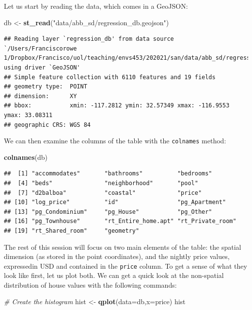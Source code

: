 \documentclass[
]{book}
\newenvironment{Shaded}{\begin{snugshade}}{\end{snugshade}}
\newcommand{\CommentTok}[1]{\textcolor[rgb]{0.56,0.35,0.01}{\textit{#1}}}
\newcommand{\DataTypeTok}[1]{\textcolor[rgb]{0.13,0.29,0.53}{#1}}
\newcommand{\KeywordTok}[1]{\textcolor[rgb]{0.13,0.29,0.53}{\textbf{#1}}}
\newcommand{\NormalTok}[1]{#1}
\newcommand{\StringTok}[1]{\textcolor[rgb]{0.31,0.60,0.02}{#1}}
\begin{document}
Let us start by reading the data, which comes in a GeoJSON:

\begin{Shaded}
\begin{Highlighting}[]
\NormalTok{db <-}\StringTok{ }\KeywordTok{st_read}\NormalTok{(}\StringTok{"data/abb_sd/regression_db.geojson"}\NormalTok{)}
\end{Highlighting}
\end{Shaded}

\begin{verbatim}
## Reading layer `regression_db' from data source `/Users/Franciscorowe 1/Dropbox/Francisco/uol/teaching/envs453/202021/san/data/abb_sd/regression_db.geojson' using driver `GeoJSON'
## Simple feature collection with 6110 features and 19 fields
## geometry type:  POINT
## dimension:      XY
## bbox:           xmin: -117.2812 ymin: 32.57349 xmax: -116.9553 ymax: 33.08311
## geographic CRS: WGS 84
\end{verbatim}

We can then examine the columns of the table with the \texttt{colnames} method:

\begin{Shaded}
\begin{Highlighting}[]
\KeywordTok{colnames}\NormalTok{(db)}
\end{Highlighting}
\end{Shaded}

\begin{verbatim}
##  [1] "accommodates"       "bathrooms"          "bedrooms"          
##  [4] "beds"               "neighborhood"       "pool"              
##  [7] "d2balboa"           "coastal"            "price"             
## [10] "log_price"          "id"                 "pg_Apartment"      
## [13] "pg_Condominium"     "pg_House"           "pg_Other"          
## [16] "pg_Townhouse"       "rt_Entire_home.apt" "rt_Private_room"   
## [19] "rt_Shared_room"     "geometry"
\end{verbatim}

The rest of this session will focus on two main elements of the table: the spatial dimension (as stored in the point coordinates), and the nightly price values, expressedin USD and contained in the \texttt{price} column. To get a sense of what they look like first, let us plot both. We can get a quick look at the non-spatial distribution of house values with the following commands:

\begin{Shaded}
\begin{Highlighting}[]
\CommentTok{# Create the histogram}
\NormalTok{hist <-}\StringTok{ }\KeywordTok{qplot}\NormalTok{(}\DataTypeTok{data=}\NormalTok{db,}\DataTypeTok{x=}\NormalTok{price)}
\NormalTok{hist}
\end{Highlighting}
\end{Shaded}
\end{document}
